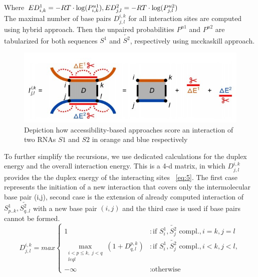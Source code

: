\documentclass[twoside,a4paper]{report}
\begin{document}
	 Where $ED^{1}_{i,k} = - RT \cdot \log(P^{u1}_{i,k}),\\ ED^{2}_{j, l} =  - RT \cdot \log(P^{u2}_{j, l})$\\
	 
	The maximal number of base pairs $D^{i,k}_{j,l}$ for all interaction sites are computed using hybrid approach. Then the  unpaired probabilities $P^{u1}$ and $P^{u2}$ are tabularized for both sequences $S^1$ and $\overleftarrow{S^2}$, respectively using mcckaskill approach.\\
	
	\begin{figure}[h]
		\includegraphics[width=0.9\linewidth]{access}
		\centering
		\caption{ Depiction how accessibility-based approaches score an interaction of two RNAs $S1$ and $S2$ in orange and blue respectively} 
		\label{fig:access}
	\end{figure}
	
	To further simplify the recursions, we use dedicated calculations for the duplex energy and the overall interaction energy. This is a 4-d matrix, in which $D^{i, k}_{j, l}$ provides the the duplex energy of the interacting sites ~\ref{eq:5}. 
	The first case represents the initiation of a new interaction that covers only the intermolecular base pair (i,j), second case is the extension of already computed interaction of  $S^1_{p..k}, \overleftarrow{S^2_{q..l}}$ with a new base pair $(i,j)$ and the third case is used if base pairs cannot be formed.\\
	
	\begin{equation}
	\label{eq:5}
	D^{i, k}_{j, l} = max \begin{cases}
	1 & : \text{if } S^1_i, \overleftarrow{S_j^2} \text{ compl.}, i = k, j = l \\ \underset{\substack{i<p\leq k,\;j<q\\leq l}}{\max}\left( 1 + D_{q, l}^{p, k} \right) &: \text{if } S^1_i, \overleftarrow{S^2_j} \text{ compl.}, i < k, j < l ,\\ -\infty & : \text{otherwise}
	\end{cases}
	\end{equation}
	
\end{document}
